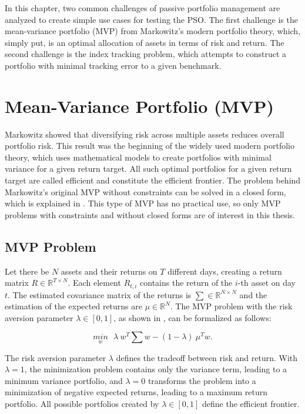 \documentclass[
  oneside, a4paper, 12pt, openany]{book}
\theoremstyle{definition}
\theoremstyle{definition}
\theoremstyle{definition}
\theoremstyle{definition}
\theoremstyle{remark}
\begin{document}
In this chapter, two common challenges of passive portfolio management are analyzed to create simple use cases for testing the PSO. The first challenge is the mean-variance portfolio (MVP) from Markowitz's modern portfolio theory, which, simply put, is an optimal allocation of assets in terms of risk and return. The second challenge is the index tracking problem, which attempts to construct a portfolio with minimal tracking error to a given benchmark.

\hypertarget{mean-variance-portfolio-mvp}{%
\section{Mean-Variance Portfolio (MVP)}\label{mean-variance-portfolio-mvp}}

Markowitz showed that diversifying risk across multiple assets reduces overall portfolio risk. This result was the beginning of the widely used modern portfolio theory, which uses mathematical models to create portfolios with minimal variance for a given return target. All such optimal portfolios for a given return target are called efficient and constitute the efficient frontier. The problem behind Markowitz's original MVP without constraints can be solved in a closed form, which is explained in \citep{Eric2021}. This type of MVP has no practical use, so only MVP problems with constraints and without closed forms are of interest in this thesis.

\hypertarget{mvp-problem}{%
\subsection{MVP Problem}\label{mvp-problem}}

Let there be \(N\) assets and their returns on \(T\) different days, creating a return matrix \(R \in \mathbb{R}^{T \times N}\). Each element \(R_{t,i}\) contains the return of the \(i\)-th asset on day \(t\). The estimated covariance matrix of the returns is \(\textstyle\sum \in \mathbb{R}^{N \times N}\) and the estimation of the expected returns are \(\mu \in \mathbb{R}^{N}\). The MVP problem with the risk aversion parameter \(\lambda \in [0,1]\), as shown in \citep{Mari2005}, can be formalized as follows:

\begin{equation} 
\underset{w}{min} \ \ \ \lambda \ w^T \textstyle\sum w - (1-\lambda) \ \mu^T w.
\label{eq:MVP}
\end{equation}

The risk aversion parameter \(\lambda\) defines the tradeoff between risk and return. With \(\lambda = 1\), the minimization problem contains only the variance term, leading to a minimum variance portfolio, and \(\lambda = 0\) transforms the problem into a minimization of negative expected returns, leading to a maximum return portfolio. All possible portfolios created by \(\lambda \in [0, 1]\) define the efficient frontier.
\end{document}
